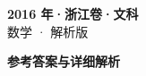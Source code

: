 \documentclass[zihao=-4, a4paper]{ctexart}
\begin{document}
\begin{center}
  {\Large\bfseries 2016 年·浙江卷·文科}\\[4pt]
  {\large 数学 · 解析版}
\end{center}
\medskip
{}

\clearpage
{}
\begin{center}{\Large\bfseries 参考答案与详细解析}\end{center}
\medskip

\end{document}
